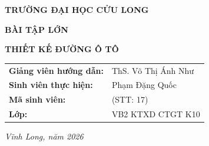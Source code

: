 \documentclass[12pt,a4paper]{article}
\begin{document}
\begin{titlepage}
    \centering
    \vspace*{0.5cm}
    
    {\fontsize{14}{17}\selectfont \textbf{TRƯỜNG ĐẠI HỌC CỬU LONG}}
    
    \vspace{3cm}
    
    {\fontsize{16}{19}\selectfont \textbf{BÀI TẬP LỚN}}
    
    \vspace{0.5cm}
    
    {\fontsize{18}{21}\selectfont \bfseries THIẾT KẾ ĐƯỜNG Ô TÔ}
    
    \vspace{2cm}
    
    \begin{tabular}{l l}
        \textbf{Giảng viên hướng dẫn:} & ThS. Võ Thị Ánh Như \\
        \textbf{Sinh viên thực hiện:} & Phạm Đặng Quốc \\
        \textbf{Mã sinh viên:} & (STT: 17) \\
        \textbf{Lớp:} & VB2 KTXD CTGT K10 \\
    \end{tabular}
    
    \vfill
    
    {\fontsize{13}{16}\selectfont \textit{Vĩnh Long, năm 2026}}
    
\end{titlepage}

\newpage
\tableofcontents

\newpage


\newpage


\newpage


\newpage

\end{document}
